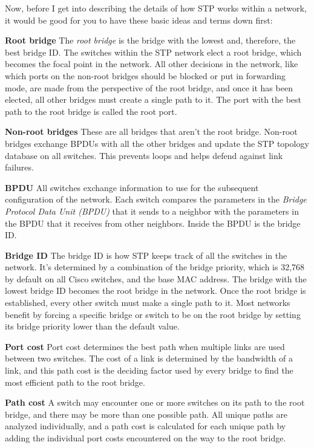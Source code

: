 \documentclass[b5paper,11pt]{memoir}
\begin{document}
Now, before I get into describing the details of how STP works within a
network, it would be good for you to have these basic ideas and terms
down first:

\textbf{Root bridge} The \emph{root bridge} is the bridge with the
lowest and, therefore, the best bridge ID. The switches within the STP
network elect a root bridge, which becomes the focal
point in the network.
All other decisions in the network, like which ports on the non-root
bridges should be blocked or put in forwarding mode, are made from the
perspective of the root bridge, and once it has been elected, all other
bridges must create a single path to it. The port with the best path to
the root bridge is called the root port.

\textbf{Non-root bridges} These are all bridges that aren't the root
bridge. Non-root bridges exchange BPDUs with all the other bridges and
update the STP topology database on all switches. This prevents loops
and helps defend against link failures.

\textbf{BPDU} All switches exchange information to use for the
subsequent configuration of the network. Each switch compares the
parameters in the \emph{Bridge Protocol Data Unit (BPDU)} that it sends
to a neighbor with the parameters in the BPDU that it receives from
other neighbors. Inside the BPDU is the bridge ID.

\textbf{Bridge ID} The bridge ID is how STP keeps track of all the
switches in the network. It's determined by a combination of the bridge
priority, which is 32,768 by default on all Cisco switches, and the base
MAC address. The bridge with the lowest bridge ID becomes the root
bridge in the network. Once the root bridge is established, every other
switch must make a single path to it. Most networks benefit by forcing a
specific bridge or switch to be on the root bridge by setting its bridge
priority lower than the default value.

\textbf{Port cost} Port cost determines the best path when multiple
links are used between two switches. The cost of a link is determined by
the bandwidth of a link, and this path cost is the deciding factor used
by every bridge to find the most efficient path to the root bridge.

\textbf{Path cost} A switch may encounter one or more switches on its
path to the root bridge, and there may be more than one possible path.
All unique paths are analyzed individually, and a path cost is
calculated for each unique path by adding the individual port costs
encountered on the way to the root bridge.
\end{document}
